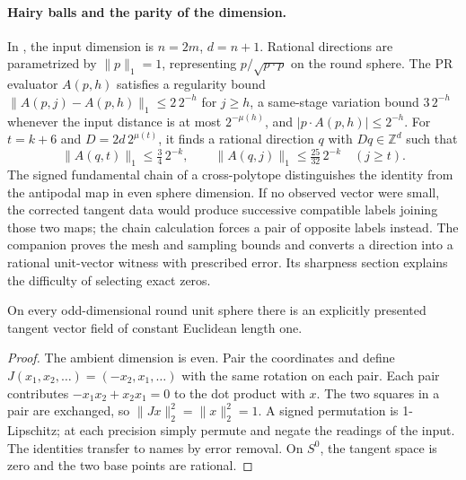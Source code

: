 \paragraph{Hairy balls and the parity of the dimension.}
In , the input dimension is $n=2m$, $d=n+1$. Rational directions are parametrized by $\|p\|_1=1$, representing $p/\sqrt{p\cdot p}$ on the round sphere. The PR evaluator $A(p,h)$ satisfies a regularity bound $\|A(p,j)-A(p,h)\|_1\le2\,2^{-h}$ for $j\ge h$, a same-stage variation bound $3\,2^{-h}$ whenever the input distance is at most $2^{-\mu(h)}$, and $|p\cdot A(p,h)|\le2^{-h}$. For $t=k+6$ and $D=2d\,2^{\mu(t)}$, it finds a rational direction $q$ with $Dq\in\mathbb Z^d$ such that
\[
       \|A(q,t)\|_1\le\tfrac34\,2^{-k},\qquad
       \|A(q,j)\|_1\le\tfrac{25}{32}\,2^{-k}\quad(j\ge t).
\]
The signed fundamental chain of a cross-polytope distinguishes the identity from the antipodal map in even sphere dimension. If no observed vector were small, the corrected tangent data would produce successive compatible labels joining those two maps; the chain calculation forces a pair of opposite labels instead. The companion proves the mesh and sampling bounds and converts a direction into a rational unit-vector witness with prescribed error. Its sharpness section explains the difficulty of selecting exact zeros.

\begin{proposition}\label{prop:oddfield}\label{idx-companions27}
On every odd-dimensional round unit sphere there is an explicitly presented tangent vector field of constant Euclidean length one.
\end{proposition}
\begin{proof}
The ambient dimension is even. Pair the coordinates and define
$J(x_1,x_2,\dots)=(-x_2,x_1,\dots)$ with the same rotation on each pair. Each pair contributes $-x_1x_2+x_2x_1=0$ to the dot product with $x$. The two squares in a pair are exchanged, so $\|Jx\|_2^2=\|x\|_2^2=1$. A signed permutation is 1-Lipschitz; at each precision simply permute and negate the readings of the input. The identities transfer to names by error removal. On $S^0$, the tangent space is zero and the two base points are rational.
\end{proof}
